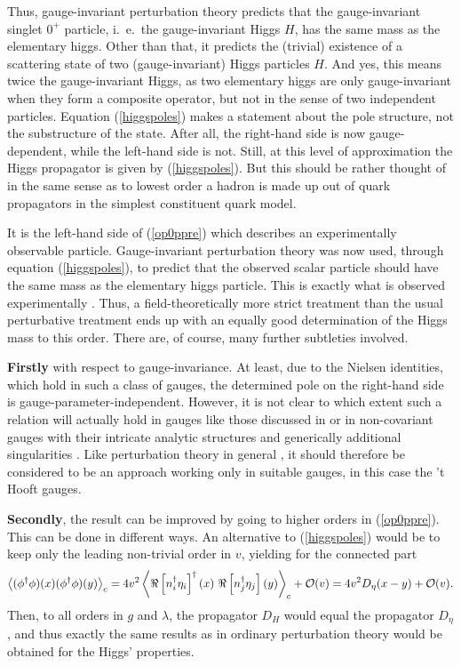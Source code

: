 \documentclass[final,twoside,12pt]{article}
\newcommand*{\no}{\noindent}
\newcommand*{\be}{\begin{equation}}
\newcommand*{\ee}{\end{equation}}
\newcommand*{\pref}[1]{(\ref{#1})}
\newcommand*{\nn}{\nonumber}
\newcommand*{\1}{1\!\!\!\bot}
\newcommand*{\la}{\left\langle}
\newcommand*{\ra}{\right\rangle}
\newcommand*{\op}{{\cal O}}
\begin{document}
Thus, gauge-invariant perturbation theory predicts that the gauge-invariant singlet $0^+$ particle, i.\ e.\ the gauge-invariant Higgs $H$, has the same mass as the elementary higgs. Other than that, it predicts the (trivial) existence of a scattering state of two (gauge-invariant) Higgs particles $H$. And yes, this means twice the gauge-invariant Higgs, as two elementary higgs are only gauge-invariant when they form a composite operator, but not in the sense of two independent particles. Equation \pref{higgspoles} makes a statement about the pole structure, not the substructure of the state. After all, the right-hand side is now gauge-dependent, while the left-hand side is not. Still, at this level of approximation the Higgs propagator is given by \pref{higgspoles}. But this should be rather thought of in the same sense as to lowest order a hadron is made up out of quark propagators in the simplest constituent quark model.

It is the left-hand side of \pref{op0ppre} which describes an experimentally observable particle. Gauge-invariant perturbation theory was now used, through equation \pref{higgspoles}, to predict that the observed scalar particle should have the same mass as the elementary higgs particle. This is exactly what is observed experimentally \cite{pdg}. Thus, a field-theoretically more strict treatment than the usual perturbative treatment \cite{Bohm:2001yx} ends up with an equally good determination of the Higgs mass to this order. There are, of course, many further subtleties involved.

{\bf Firstly} with respect to gauge-invariance. At least, due to the Nielsen identities, which hold in such a class of gauges, the determined pole on the right-hand side is gauge-parameter-independent. However, it is not clear to which extent such a relation will actually hold in gauges like those discussed in \cite{Dolan:1974gu} or in non-covariant gauges with their intricate analytic structures and generically additional singularities \cite{Burnel:2008zz}. Like perturbation theory in general \cite{Lee:1974zg}, it should therefore be considered to be an approach working only in suitable gauges, in this case the 't Hooft gauges.

{\bf Secondly}, the result can be improved by going to higher orders in \pref{op0ppre}. This can be done in different ways. An alternative to \pref{higgspoles} would be to keep only the leading non-trivial order in $v$, yielding for the connected part
\be
\la(\phi^\dagger\phi)(x)(\phi^\dagger\phi)(y)\ra_c = 4v^2\la \Re\left[n_i^\dagger\eta_i\right]^\dagger(x)~\Re\left[n_j^\dagger\eta_j\right](y) \ra_c+\op(v)=4v^2D_\eta(x-y)+\op(v)\nn.
\ee
\no Then, to all orders in $g$ and $\lambda$, the propagator $D_H$ would equal the propagator $D_\eta$, and thus exactly the same results as in ordinary perturbation theory would be obtained for the Higgs' properties.
\end{document}
